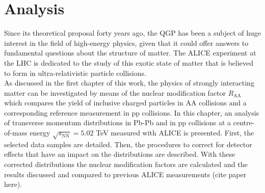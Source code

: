 \documentclass[12pt,a4paper]{report}
\begin{document}
\chapter{Analysis}
Since its theoretical proposal forty years ago, the QGP has been a subject of huge interest in the field of high-energy physics, given that it could offer answers to fundamental questions about the structure of matter. The ALICE experiment at the LHC is dedicated to the study of this exotic state of matter that is believed to form in ultra-relativistic particle collisions. \\
As discussed in the first chapter of this work, the physics of strongly interacting matter can be investigated by means of the nuclear modification factor $R_\text{AA}$ which compares the yield of inclusive charged particles in AA collisions and a corresponding reference measurement in pp collisions. In this chapter, an analysis of transverse momentum distributions in Pb-Pb and in pp collisions at a centre-of-mass energy $\sqrt{s_\text{NN}}= 5.02$ TeV measured with ALICE is presented. First, the selected data samples are detailed. Then, the procedures to correct for detector effects that have an impact on the \pt distributions are described. With these corrected \pt distributions the nuclear modification factors are calculated and the results discussed and compared to previous ALICE measurements (cite paper here).
\end{document}
